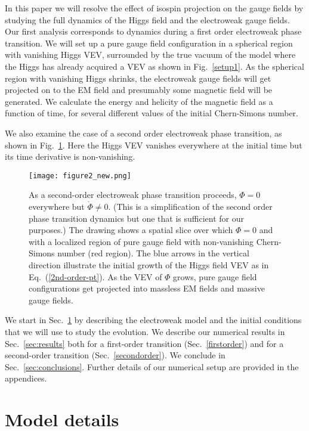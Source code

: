 \documentclass[prd,twocolumn,nofootinbib]{revtex4-1}
\begin{document}
In this paper we will resolve the effect of isospin projection on the gauge fields by
studying the full dynamics of the Higgs field and the electroweak gauge fields. 
Our first analysis corresponds to dynamics during a first order electroweak phase 
transition. We will
set up a pure gauge field configuration in a spherical region with vanishing Higgs VEV,
surrounded by the true vacuum of the model where the Higgs has already acquired a 
VEV as shown in Fig.~\ref{setup1}. As the spherical region with vanishing Higgs
shrinks, the electroweak gauge fields will get projected on to the EM field
and presumably some magnetic field will be generated. We calculate the energy and helicity 
of the magnetic field as a function of time, for several different values of the initial 
Chern-Simons number.  

We also examine the case of a second order electroweak phase transition, as
shown in Fig.~\ref{setup2}. Here the Higgs VEV vanishes
everywhere at the initial time but its time derivative is non-vanishing.

\begin{figure}
  \texttt{[image: figure2\_new.png]}
  \caption{
	 As a second-order electroweak 
	  phase transition proceeds, $\Phi=0$
  everywhere but ${\dot \Phi}\ne 0$. (This is a simplification of the second
  order phase transition dynamics but one that is sufficient for our purposes.) 	
  The drawing shows a spatial slice over which $\Phi=0$ and with a localized region 
	of pure gauge field with non-vanishing Chern-Simons number 
	(red region). The blue arrows in the vertical direction 
	illustrate the initial growth of the Higgs field VEV 
	as in Eq.~(\ref{2nd-order-pt}). As the VEV of $\Phi$ grows, 
	pure gauge field configurations get projected into massless EM fields 
	and massive gauge fields. 
	  }
\label{setup2}
\end{figure}

We start in Sec.~\ref{sec:model} by describing the electroweak model and the initial conditions 
that we will use to study the evolution. We describe our numerical results in Sec.~\ref{sec:results}
both for a first-order transition (Sec.~\ref{firstorder}) and for a second-order transition 
(Sec.~\ref{secondorder}). We conclude in Sec.~\ref{sec:conclusions}.
Further details of our numerical setup are provided in the appendices.

\section{Model details}
\label{sec:model}
\end{document}
